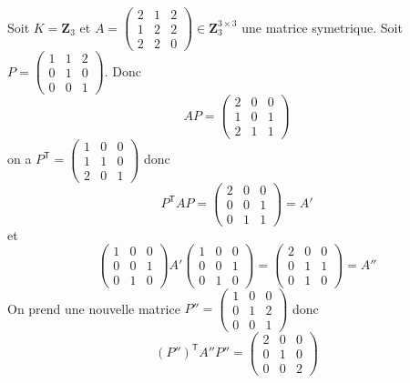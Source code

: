\begin{example}
Soit $K=\mathbf{Z}_{3}$ et $A=\begin{pmatrix}2 & 1 & 2 \\ 1 & 2 & 2 \\ 2 & 2 & 0\end{pmatrix}\in \mathbf{Z}_{3}^{3\times3}$ une matrice symetrique. Soit $P=\begin{pmatrix}1 & 1 & 2 \\ 0 & 1 & 0 \\ 0 & 0 & 1\end{pmatrix}$. Donc 
$$
AP=\begin{pmatrix}
2 & 0 & 0 \\
1 & 0 & 1 \\
2 & 1 & 1
\end{pmatrix}
$$
on a $P^{\mathsf{T}}=\begin{pmatrix}1 & 0 & 0 \\ 1 & 1 & 0 \\ 2 & 0 & 1\end{pmatrix}$ donc 
$$
P^{\mathsf{T}}AP=\begin{pmatrix}
2 & 0 & 0 \\
0 & 0 & 1 \\
0 & 1 & 1
\end{pmatrix}=A'
$$
et 
$$
\begin{pmatrix}
1 & 0 & 0 \\
0 & 0 & 1 \\
0 & 1 & 0
\end{pmatrix}A'\begin{pmatrix}
1 & 0 & 0 \\
0 & 0 & 1 \\
0 & 1 & 0
\end{pmatrix}=\begin{pmatrix}
2 & 0 & 0 \\
0 & 1 & 1 \\
0 & 1 & 0
\end{pmatrix}=A''
$$
On prend une nouvelle matrice $P''=\begin{pmatrix}1 & 0 & 0 \\ 0 & 1 & 2 \\ 0 & 0 & 1\end{pmatrix}$ donc
$$
(P'')^{\mathsf{T}}A''P''= \begin{pmatrix}
2 & 0 & 0 \\
0 & 1 & 0 \\
0 & 0 & 2
\end{pmatrix}
$$
\end{example}

